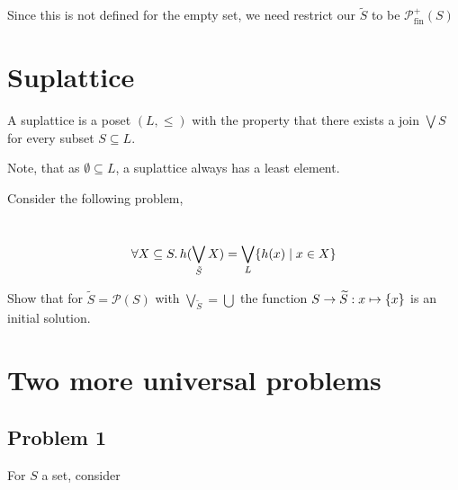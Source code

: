 Since this is not defined for the empty set, we need restrict our $\tilde{S}$
to be $\mathcal{P}_{\mathrm{fin}}^{+}(S)$

\section{Suplattice}

\begin{definition}
A suplattice is a poset $(L, \le)$ with the property that there exists a join
${\bigvee}S$ for every subset $S \subseteq L$.
\end{definition}

Note, that as $\emptyset \subseteq L$, a suplattice always has a least
element.

Consider the following problem,
\begin{center}
     \\[3mm]
      \[
        \forall X \subseteq S\ldotp
          h(\bigvee_{\tilde{S}}X) = \bigvee_L \{ h(x) \mid x \in X \}
      \]
\end{center}

\begin{exercise}
    Show that for $\widetilde{S} = \mathcal{P}(S)$ with
    $\bigvee_{\widetilde{S}}=\bigcup$ the function
    $S \to \widetilde{S}: x \mapsto \{  x  \}$ is an initial solution.
\end{exercise}

\section{Two more universal problems}

\subsection{Problem 1}

For $S$ a set, consider
\begin{center}
     \\[3mm]
\end{center}

